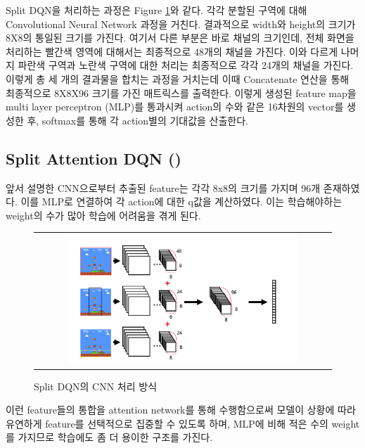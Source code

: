 Split DQN을 처리하는 과정은 Figure \ref{fig:split_dqn}와 같다. 
각각 분할된 구역에 대해 Convolutional Neural Network 과정을 거친다. 
결과적으로 width와 height의 크기가 8X8의 통일된 크기를 가진다. 
여기서 다른 부분은 바로 채널의 크기인데, 전체 화면을 처리하는 빨간색 영역에 대해서는 최종적으로 48개의 채널을 가진다.
이와 다르게 나머지 파란색 구역과 노란색 구역에 대한 처리는 최종적으로 각각 24개의 채널을 가진다. 
이렇게 총 세 개의 결과물을 합치는 과정을 거치는데 이때 Concatenate 연산을 통해 최종적으로 8X8X96 크기를 가진 매트릭스를 출력한다. 
이렇게 생성된 feature map을 multi layer perceptron (MLP)를 통과시켜 action의 수와 같은 16차원의 vector를 생성한 후, softmax를 통해 각 action별의 기대값을 산출한다.

\subsection{Split Attention DQN (\sadqnname)}
\label{sec:method:idea}
앞서 설명한  CNN으로부터 추출된 feature는 각각 8x8의 크기를 가지며 96개 존재하였다.
 이를 MLP로 연결하여 각 action에 대한 q값을 계산하였다.
이는 학습해야하는 weight의 수가 많아 학습에 어려움을 겪게 된다.
%
\begin{figure}[ht]
\begin{center}
\begin{tabular}{c}
     \includegraphics[width=0.8\textwidth]{FIG/split_dqn.png} \\
\end{tabular}
\caption{
	Split DQN의 CNN 처리 방식
}
\label{fig:split_dqn}
\end{center}
\end{figure}
 이런 feature들의 통합을 attention network를 통해 수행함으로써 모델이 상황에 따라 유연하게 feature를 선택적으로 집중할 수 있도록 하며, MLP에 비해 적은 수의 weight를 가지므로 학습에도 좀 더 용이한 구조를 가진다.
